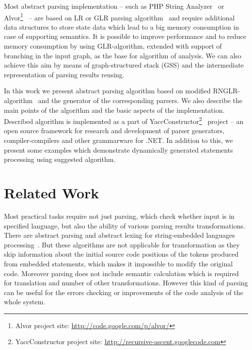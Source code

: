 \documentclass{acm_proc_article-sp}
\begin{document}
Most abstract parsing implementation -- such as PHP String Analyzer~\cite{Minamide:2005:SAD:1060745.1060809} or Alvor\footnote{Alvor project site: \href{http://code.google.com/p/alvor/}{http://code.google.com/p/alvor/}}~\cite{AlvorConf,Annamaa:2010:ITA:1947873.1947886} -- are based on LR or GLR parsing algorithm~\cite{Grune:2010:PTP:1951778} and require additional data structures to store state data which lead to a big memory consumption in case of supporting semantics. It is possible to improve performance and to reduce memory consumption by using GLR-algorithm, extended with support of branching in the input graph, as the base for algorithm of analysis. We can also achieve this aim by means of graph-structured stack (GSS) and the intermediate representation of parsing results reusing.

In this work we present abstract parsing algorithm based on modified RNGLR-algorithm~\cite{Scott:2006:RNG:1146809.1146810} and  the generator of the corresponding parsers. We also describe the main points of the algorithm and the basic aspects of the implementation. Described algorithm is implemented as a part of YaccConstructor\footnote{YaccConstructor project site: \href{http://recursive-ascent.googlecode.com}{http://recursive-ascent.googlecode.com}}~\cite{GrigorevKirilenkoYC} project -- an open source framework for research and development of parser generators, compiler-compilers and other grammarware for .NET. In addition to this, we present some examples which demonstrate dynamically generated statements processing using suggested algorithm.

\section{Related Work}

Most practical tasks require not just parsing, which check whether input is in specified language, but also the ability of various parsing results transformations. There are abstract parsing and abstract lexing for string-embedded languages processing~\cite{Doh:2009:APS:1615441.1615461}. But these algorithms are not applicable for transformation as they skip information about the initial source code positions of the tokens produced from embedded statements, which makes it impossible to modify the original code. Moreover parsing does not include semantic calculation which is required for translation and number of other transformations. However this kind of parsing can be useful for the errors checking or improvements of the code analysis of the whole system.
 
\end{document}
